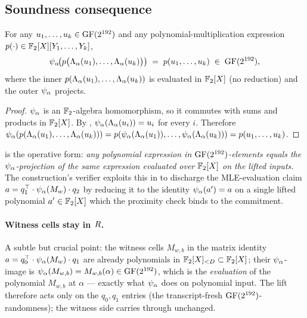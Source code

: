 \subsection{Soundness consequence}

\begin{corollary}
\label{cor:lift-commutes}
For any $u_1, \ldots, u_k \in \mathrm{GF}(2^{192})$ and any polynomial-multiplication
expression $p(\cdot) \in \mathbb{F}_2[X][Y_1, \ldots, Y_k]$,
\[
  \psi_{\alpha}\!\big(p\big(\Lambda_{\alpha}(u_1), \ldots, \Lambda_{\alpha}(u_k)\big)\big)
  \;=\;
  p(u_1, \ldots, u_k) \;\in\; \mathrm{GF}(2^{192}),
\]
where the inner $p(\Lambda_{\alpha}(u_1), \ldots, \Lambda_{\alpha}(u_k))$ is evaluated in
$\mathbb{F}_2[X]$ (no reduction) and the outer $\psi_{\alpha}$ projects.
\end{corollary}

\begin{proof}
$\psi_{\alpha}$ is an $\mathbb{F}_2$-algebra homomorphism, so it commutes with sums
and products in $\mathbb{F}_2[X]$. By ,
$\psi_{\alpha}(\Lambda_{\alpha}(u_i)) = u_i$ for every $i$. Therefore
$\psi_{\alpha}(p(\Lambda_{\alpha}(u_1), \ldots, \Lambda_{\alpha}(u_k))) =
p(\psi_{\alpha}(\Lambda_{\alpha}(u_1)), \ldots, \psi_{\alpha}(\Lambda_{\alpha}(u_k))) =
p(u_1, \ldots, u_k)$.
\end{proof}

 is the operative form: \emph{any
polynomial expression in $\mathrm{GF}(2^{192})$-elements equals the $\psi_{\alpha}$-projection
of the same expression evaluated over $\mathbb{F}_2[X]$ on the lifted
inputs.} The construction's verifier exploits this in
 to discharge the MLE-evaluation claim
$a = q_1^\top \cdot \psi_{\alpha}(M_w) \cdot q_2$ by reducing it to the
identity $\psi_{\alpha}(a') = a$ on a single lifted polynomial $a' \in
\mathbb{F}_2[X]$ which the proximity check binds to the commitment.

\paragraph{Witness cells stay in $R$.} A subtle but crucial
point: the witness cells $M_{w, b}$ in the matrix identity
$a = q_0^\top \cdot \psi_{\alpha}(M_w) \cdot q_1$ are already polynomials in
$\mathbb{F}_2[X]_{<D} \subset \mathbb{F}_2[X]$; their $\psi_{\alpha}$-image is
$\psi_{\alpha}(M_{w,b}) = M_{w,b}(\alpha) \in \mathrm{GF}(2^{192})$, which is the
\emph{evaluation} of the polynomial $M_{w,b}$ at $\alpha$ — exactly
what $\psi_{\alpha}$ does on polynomial input. The lift therefore acts only on
the $q_0, q_1$ entries (the transcript-fresh $\mathrm{GF}(2^{192})$-randomness); the
witness side carries through unchanged.
